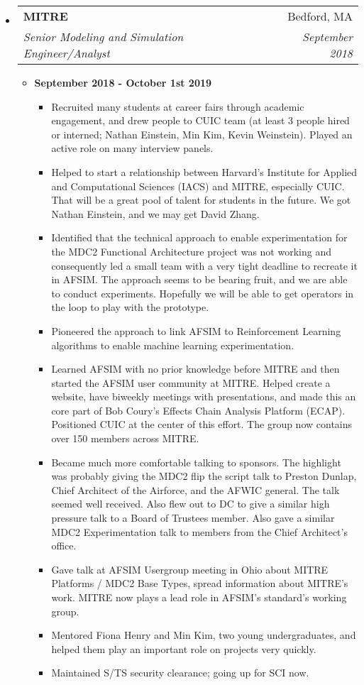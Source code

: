 \documentclass[letterpaper,11pt]{article}
\makeatletter
\newcommand{\resitem}[1]{\item #1 \vspace{-2pt}}
\newcommand{\ressubheading}[4]{\vspace{-14pt}
\begin{tabular*}{7.0in}{l@{\extracolsep{\fill}}r}
                \\
                \textbf{#1} & #2 \\
                \textit{#3} & \textit{#4} \\
\end{tabular*}\vspace{-6pt}}
\makeatother
\begin{document}
\begin{itemize}
\item  \ressubheading{MITRE}{Bedford, MA}{Senior Modeling and Simulation Engineer/Analyst}{September 2018}

\begin{itemize}
\item \textbf{September 2018 - October 1st 2019}

\begin{itemize}
\resitem{Recruited many students at career fairs through academic engagement, and drew people to CUIC team (at least 3 people hired or interned; Nathan Einstein, Min Kim, Kevin Weinstein). Played an active role on many interview panels.}
\resitem{Helped to start a relationship between Harvard's Institute for Applied and Computational Sciences (IACS) and MITRE, especially CUIC. That will be a great pool of talent for students in the future. We got Nathan Einstein, and we may get David Zhang.}
\resitem{Identified that the technical approach to enable experimentation for the MDC2 Functional Architecture project was not working and consequently led a small team with a very tight deadline to recreate it in AFSIM. The approach seems to be bearing fruit, and we are able to conduct experiments. Hopefully we will be able to get operators in the loop to play with the prototype.}
\resitem{Pioneered the approach to link AFSIM to Reinforcement Learning algorithms to enable machine learning experimentation.}
\resitem{Learned AFSIM with no prior knowledge before MITRE and then started the AFSIM user community at MITRE. Helped create a website, have biweekly meetings with presentations, and made this an core part of Bob Coury's Effects Chain Analysis Platform (ECAP). Positioned CUIC at the center of this effort. The group now contains over 150 members across MITRE.}
\resitem{Became much more comfortable talking to sponsors. The highlight was probably giving the MDC2 flip the script talk to Preston Dunlap, Chief Architect of the Airforce, and the AFWIC general. The talk seemed well received. Also flew out to DC to give a similar high pressure talk to a Board of Trustees member. Also gave a similar MDC2 Experimentation talk to members from the Chief Architect's office.}
\resitem{Gave talk at AFSIM Usergroup meeting in Ohio about MITRE Platforms / MDC2 Base Types, spread information about MITRE's work. MITRE now plays a lead role in AFSIM's standard's working group.}
\resitem{Mentored Fiona Henry and Min Kim, two young undergraduates, and helped them play an important role on projects very quickly.}
\resitem{Maintained S/TS security clearance; going up for SCI now.}
\end{itemize}     

\end{itemize}

\end{itemize}
\end{document}
